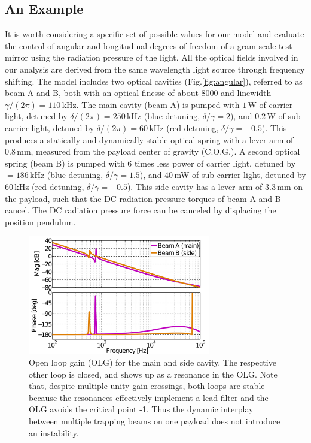 

\subsection{An Example}

It is worth considering a specific set of possible values for our model and evaluate the control of  angular and longitudinal degrees of freedom of a gram-scale test mirror using the radiation pressure of the light.
All the optical fields involved in our analysis are derived from the same wavelength light source through frequency shifting.
The model includes two optical cavities (Fig.\ref{fig:angular}), referred to as beam A and B, both with an optical finesse of  about $8000$ and linewidth $\gamma/(2 \pi) = 110\,$kHz. 
The main cavity (beam A) is pumped with $1\,$W of carrier light, detuned by $\delta/(2 \pi)= 250\,$kHz (blue detuning, $\delta/\gamma = 2$), and $0.2\,$W of sub-carrier light, detuned by $\delta/(2 \pi) =60\,$kHz (red detuning, $\delta/\gamma = -0.5$). This produces a statically and dynamically stable optical spring with a lever arm of $0.8\,$mm, measured from the payload center of gravity (C.O.G.). A second optical spring (beam B) is pumped with 6 times less power of carrier light, detuned by $=186\,$kHz (blue detuning, $\delta/\gamma=1.5$), and $40\,$mW of sub-carrier light, detuned by $60\,$kHz (red detuning, $\delta/\gamma=-0.5$). This side cavity has a lever arm of $3.3\,$mm on the payload, such that the DC radiation pressure torques of beam A and B cancel. The DC radiation pressure force can be canceled by displacing the position pendulum.

\begin{figure}[htbp]
	\centering
		\includegraphics[width=8cm]{./figures/open_loops_TF_paper2.pdf}%
	\caption{{Open loop gain (OLG) for the main and side cavity.	The respective other loop is closed, and shows up as a resonance in the OLG. Note that, despite multiple unity gain crossings, both loops are stable because the resonances effectively implement a lead filter and the OLG avoids the critical point -1. Thus the dynamic interplay between multiple trapping beams on one payload does not introduce an instability.}}
	\label{fig:control_loops}
\end{figure}


